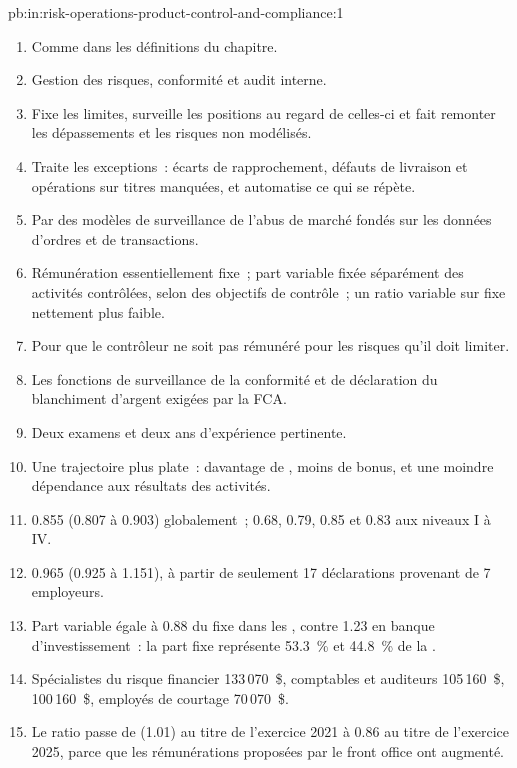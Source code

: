 \begin{solution}{pb:in:risk-operations-product-control-and-compliance:1}
\begin{enumerate}
\item Comme dans les définitions du chapitre.
\item Gestion des risques, conformité et audit interne.
\item Fixe les limites, surveille les positions au regard de celles-ci et fait remonter les dépassements et les risques non modélisés.
\item Traite les exceptions~: écarts de rapprochement, défauts de livraison et opérations sur titres manquées, et automatise ce qui se répète.
\item Par des modèles de surveillance de l'abus de marché fondés sur les données d'ordres et de transactions.
\item Rémunération essentiellement fixe~; part variable fixée séparément des activités contrôlées, selon des objectifs de contrôle~; un
ratio variable sur fixe nettement plus faible.
\item Pour que le contrôleur ne soit pas rémunéré pour les risques qu'il doit limiter.
\item Les fonctions de surveillance de la conformité et de déclaration du blanchiment d'argent exigées par la FCA.
\item Deux examens et deux ans d'expérience pertinente.
\item Une trajectoire plus plate~: davantage de , moins de bonus, et une moindre dépendance aux résultats des activités.
\item 0.855 (0.807 à 0.903) globalement~; 0.68, 0.79, 0.85 et 0.83 aux niveaux I à IV.
\item 0.965 (0.925 à 1.151), à partir de seulement 17 déclarations provenant de 7 employeurs.
\item Part variable égale à 0.88 du fixe dans les , contre 1.23 en banque d'investissement~: la part fixe représente 53.3~\% et 44.8~\% de
la .
\item Spécialistes du risque financier 133\,070~\$, comptables et auditeurs 105\,160~\$,  100\,160~\$,
employés de courtage 70\,070~\$.
\item Le ratio passe de (1.01) au titre de l'exercice 2021 à 0.86 au titre de l'exercice 2025, parce que les rémunérations proposées par le front office ont augmenté.

\end{enumerate}
\end{solution}
